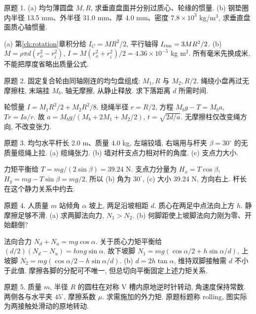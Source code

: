 \begin{exercise}
原题 1. (a) 均匀薄圆盘 $M,R$, 求垂直盘面并分别过质心、轮缘的惯量. (b) 钢垫圈内半径 13.5 mm、外半径 31.0 mm、厚 4.0 mm、密度 $7.8\times10^3$ kg/m$^3$, 求垂直盘面质心轴惯量.
\end{exercise}
\begin{solution}
(a) 第\ref{ch:rotation}章积分给 $I_C=MR^2/2$, 平行轴得 $I_{\rm rim}=3MR^2/2$. (b) $M=\rho\pi d(r_o^2-r_i^2)$, $I=M(r_o^2+r_i^2)/2=4.36\times10^{-5}$ kg m$^2$. 所有毫米先换成米, 不能把厚度省略出质量公式.
\end{solution}
\begin{exercise}
原题 2. 固定复合轮由同轴刚连的均匀盘组成: $M_1,R$ 与 $M_2,R/2$. 绳绕小盘再过无摩擦柱, 末端挂 $M_b$. 轴无摩擦, 从静止释放. 求下落距离 $d$ 所需时间.
\end{exercise}
\begin{solution}
轮惯量 $I=M_1R^2/2+M_2R^2/8$. 绕绳半径 $r=R/2$, 方程 $M_bg-T=M_ba$, $Tr=I a/r$. 故 $a=M_bg/(M_b+2M_1+M_2/2)$, $t=\sqrt{2d/a}$. 无摩擦柱仅改变绳方向, 不改变张力.
\end{solution}
\begin{exercise}
原题 3. 均匀水平杆长 2.0 m、质量 4.0 kg, 左端铰墙, 右端用与杆夹 $\beta=30^\circ$ 的无质量缆绳上拉. (a) 缆绳张力. (b) 墙对杆支点力相对杆的角度. (c) 支点力大小.
\end{exercise}
\begin{solution}
力矩平衡给 $T=mg/(2\sin\beta)=39.24$ N. 支点力分量为 $H_x=T\cos\beta$, $H_y=mg-T\sin\beta=mg/2$, 所以 (b) 角为 $30^\circ$, (c) 大小 39.24 N, 方向右上. 杆长在这个静力关系中约去.
\end{solution}
\begin{exercise}
原题 4. 人质量 $m$ 站倾角 $\alpha$ 坡上, 两足沿坡相距 $d$. 质心在两足中点法向上方 $h$. 静摩擦足够不滑. (a) 求两脚法向力, $N_1>N_2$. (b) 何脚距使上坡脚法向力刚为零、开始翻倒?
\end{exercise}
\begin{solution}
法向合力 $N_d+N_u=mg\cos\alpha$. 关于质心力矩平衡给 $(d/2)(N_d-N_u)=hmg\sin\alpha$. 故下坡脚 $N_1=mg(\cos\alpha/2+h\sin\alpha/d)$, 上坡脚 $N_2=mg(\cos\alpha/2-h\sin\alpha/d)$. (b) $d=2h\tan\alpha$, 维持双脚接触需 $d$ 不小于此值. 摩擦各脚的分配可不唯一, 但总切向平衡固定上述力矩关系.
\end{solution}
\begin{exercise}
原题 5. 质量 $m$, 半径 $R$ 的圆柱在对称 V 槽内原地逆时针转动, 角速度保持常数. 两侧各与水平夹 $45^\circ$, 摩擦系数 $\mu$. 求需施加的外力矩. 原题标题称 rolling, 图实际为两接触处滑动的原地转动.
\end{exercise}

